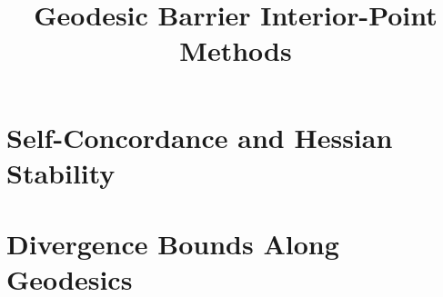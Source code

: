 \documentclass{article}
\title{Geodesic Barrier Interior-Point Methods}
\author{}
\date{}
\begin{document}
\maketitle

\section{Self-Concordance and Hessian Stability}


\section{Divergence Bounds Along Geodesics}

\end{document}
